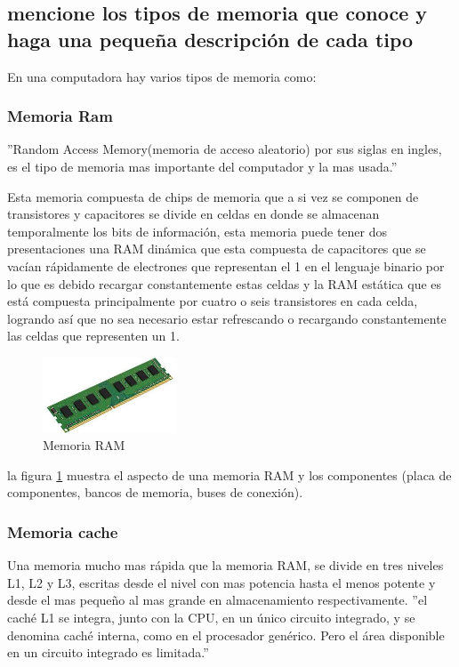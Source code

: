 \documentclass{article}
\begin{document}
    \subsection{mencione los tipos de memoria que conoce y haga una pequeña descripción de cada tipo}
    En una computadora hay varios tipos de memoria como: 
    
        \subsubsection{Memoria Ram}
        ''Random Access Memory(memoria de acceso aleatorio) por sus siglas en ingles, es el tipo de memoria mas importante del computador y la mas usada.'' \cite{arquitectura} \newline

        Esta memoria compuesta de chips de memoria que a si vez se componen de transistores y capacitores se divide en celdas en donde se almacenan temporalmente los bits de información, esta memoria puede tener dos presentaciones una RAM dinámica que esta compuesta de capacitores que se vacían rápidamente de electrones que representan el 1 en el lenguaje binario por lo que es debido recargar constantemente estas celdas y la RAM estática que es está compuesta principalmente por cuatro o seis transistores en cada celda, logrando así que no sea necesario estar refrescando o recargando constantemente las celdas que representen un 1.
        
        \begin{figure}[h]
        \includegraphics[width=4cm]{ram.jpg}
        \centering
        \caption{Memoria RAM}
        \label{fig:Memoria RAM}
        \end{figure}    
        
        la figura \ref{fig:Memoria RAM} muestra el aspecto de una memoria RAM y los componentes (placa de componentes, bancos de memoria, buses de conexión).
        
        \subsubsection{Memoria cache}
        Una memoria mucho mas rápida que la memoria RAM, se divide en tres niveles L1, L2 y L3, escritas desde el nivel con mas potencia hasta el menos potente y desde el mas pequeño al mas grande en almacenamiento respectivamente. ''el caché L1 se integra, junto con la CPU, en un único circuito integrado, y se denomina caché interna, como en el procesador genérico. Pero el área  disponible en un circuito integrado es limitada.'' \cite{Mano} 
        
\end{document}
